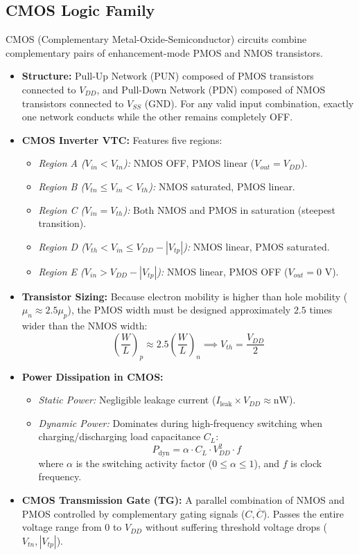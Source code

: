 \documentclass[12pt,a4paper]{article}
\begin{document}
\subsection{CMOS Logic Family}
CMOS (Complementary Metal-Oxide-Semiconductor) circuits combine complementary pairs of enhancement-mode PMOS and NMOS transistors.
\begin{itemize}[leftmargin=*, itemsep=3pt]
  \item \textbf{Structure:} Pull-Up Network (PUN) composed of PMOS transistors connected to $V_{DD}$, and Pull-Down Network (PDN) composed of NMOS transistors connected to $V_{SS}$ (GND). For any valid input combination, exactly one network conducts while the other remains completely OFF.
  \item \textbf{CMOS Inverter VTC:} Features five regions:
    \begin{itemize}
      \item \textit{Region A ($V_{in} < V_{tn}$):} NMOS OFF, PMOS linear ($V_{out} = V_{DD}$).
      \item \textit{Region B ($V_{tn} \le V_{in} < V_{th}$):} NMOS saturated, PMOS linear.
      \item \textit{Region C ($V_{in} = V_{th}$):} Both NMOS and PMOS in saturation (steepest transition).
      \item \textit{Region D ($V_{th} < V_{in} \le V_{DD} - |V_{tp}|$):} NMOS linear, PMOS saturated.
      \item \textit{Region E ($V_{in} > V_{DD} - |V_{tp}|$):} NMOS linear, PMOS OFF ($V_{out} = 0\text{ V}$).
    \end{itemize}
  \item \textbf{Transistor Sizing:} Because electron mobility is higher than hole mobility ($\mu_n \approx 2.5 \mu_p$), the PMOS width must be designed approximately $2.5$ times wider than the NMOS width:
  \begin{equation}
    \left(\frac{W}{L}\right)_p \approx 2.5 \left(\frac{W}{L}\right)_n \implies V_{th} = \frac{V_{DD}}{2}
  \end{equation}
  \item \textbf{Power Dissipation in CMOS:}
    \begin{itemize}
      \item \textit{Static Power:} Negligible leakage current ($I_{\text{leak}} \times V_{DD} \approx \text{nW}$).
      \item \textit{Dynamic Power:} Dominates during high-frequency switching when charging/discharging load capacitance $C_L$:
      \begin{equation}
        P_{\text{dyn}} = \alpha \cdot C_L \cdot V_{DD}^2 \cdot f
      \end{equation}
      where $\alpha$ is the switching activity factor ($0 \le \alpha \le 1$), and $f$ is clock frequency.
    \end{itemize}
  \item \textbf{CMOS Transmission Gate (TG):} A parallel combination of NMOS and PMOS controlled by complementary gating signals ($C, \overline{C}$). Passes the entire voltage range from $0$ to $V_{DD}$ without suffering threshold voltage drops ($V_{tn}, |V_{tp}|$).
\end{itemize}
\end{document}
